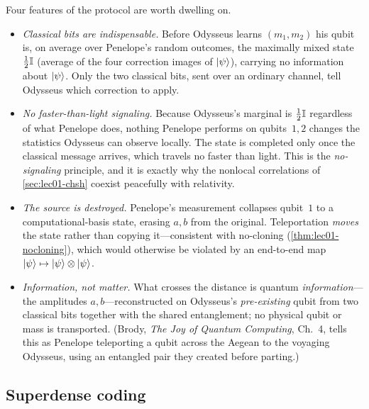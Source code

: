 \begin{remark}
Four features of the protocol are worth dwelling on.
\begin{itemize}[nosep]
  \item \emph{Classical bits are indispensable.} Before Odysseus learns $(m_1,m_2)$ his
        qubit is, on average over Penelope's random outcomes, the maximally mixed state
        $\tfrac12\mathbb{I}$ (average of the four correction images of $\ket{\psi}$), carrying
        no information about $\ket{\psi}$. Only the two classical bits, sent over an
        ordinary channel, tell Odysseus which correction to apply.
  \item \emph{No faster-than-light signaling.} Because Odysseus's marginal is $\tfrac12\mathbb{I}$
        regardless of what Penelope does, nothing Penelope performs on qubits~$1,2$ changes
        the statistics Odysseus can observe locally. The state is completed only once the
        classical message arrives, which travels no faster than light. This is the
        \emph{no-signaling} principle, and it is exactly why the nonlocal correlations
        of \cref{sec:lec01-chsh} coexist peacefully with relativity.
  \item \emph{The source is destroyed.} Penelope's measurement collapses qubit~$1$ to a
        computational-basis state, erasing $a,b$ from the original. Teleportation
        \emph{moves} the state rather than copying it---consistent with no-cloning
        (\cref{thm:lec01-nocloning}), which would otherwise be violated by an
        end-to-end map $\ket{\psi}\mapsto\ket{\psi}\otimes\ket{\psi}$.
  \item \emph{Information, not matter.} What crosses the distance is quantum
        \emph{information}---the amplitudes $a,b$---reconstructed on Odysseus's
        \emph{pre-existing} qubit from two classical bits together with the shared
        entanglement; no physical qubit or mass is transported. (Brody, \emph{The Joy of
        Quantum Computing}, Ch.~4, tells this as Penelope teleporting a qubit across the
        Aegean to the voyaging Odysseus, using an entangled pair they created before parting.)
\end{itemize}
\end{remark}

\subsection{Superdense coding}

